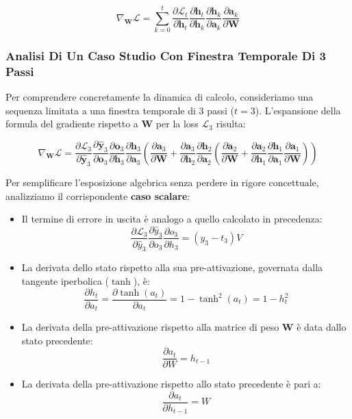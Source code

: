 ﻿\documentclass[11pt, a4paper]{article}
\begin{document}
\[
\nabla_{\bm{W}}\mathcal{L} = \sum_{k=0}^{t} \frac{\partial \mathcal{L}_t}{\partial \bm{h}_t} \frac{\partial \bm{h}_t}{\partial \bm{h}_k} \frac{\partial \bm{h}_k}{\partial \bm{a}_k} \frac{\partial \bm{a}_k}{\partial \bm{W}}
\]

\subsubsection{Analisi Di Un Caso Studio Con Finestra Temporale Di 3 Passi}

Per comprendere concretamente la dinamica di calcolo, consideriamo una sequenza limitata a una finestra temporale di 3 passi ($t=3$). L'espansione della formula del gradiente rispetto a $\bm{W}$ per la loss $\mathcal{L}_3$ risulta:

\[
\nabla_{\bm{W}}\mathcal{L} = \frac{\partial \mathcal{L}_3}{\partial \hat{\bm{y}}_3} \frac{\partial \hat{\bm{y}}_3}{\partial \bm{o}_3} \frac{\partial \bm{o}_3}{\partial \bm{h}_3} \frac{\partial \bm{h}_3}{\partial \bm{a}_3} \left( \frac{\partial \bm{a}_3}{\partial \bm{W}} + \frac{\partial \bm{a}_3}{\partial \bm{h}_2} \frac{\partial \bm{h}_2}{\partial \bm{a}_2} \left( \frac{\partial \bm{a}_2}{\partial \bm{W}} + \frac{\partial \bm{a}_2}{\partial \bm{h}_1} \frac{\partial \bm{h}_1}{\partial \bm{a}_1} \frac{\partial \bm{a}_1}{\partial \bm{W}} \right) \right)
\]

Per semplificare l'esposizione algebrica senza perdere in rigore concettuale, analizziamo il corrispondente \textbf{caso scalare}:

\begin{itemize}
    \item Il termine di errore in uscita è analogo a quello calcolato in precedenza:
    \[
    \frac{\partial \mathcal{L}_3}{\partial \hat{y}_3} \frac{\partial \hat{y}_3}{\partial o_3} \frac{\partial o_3}{\partial h_3} = (y_3 - t_3)V
    \]
    \item La derivata dello stato rispetto alla sua pre-attivazione, governata dalla tangente iperbolica ($\tanh$), è:
    \[
    \frac{\partial h_t}{\partial a_t} = \frac{\partial \tanh(a_t)}{\partial a_t} = 1 - \tanh^2(a_t) = 1 - h_t^2
    \]
    \item La derivata della pre-attivazione rispetto alla matrice di peso $\bm{W}$ è data dallo stato precedente:
    \[
    \frac{\partial a_t}{\partial W} = h_{t-1}
    \]
    \item La derivata della pre-attivazione rispetto allo stato precedente è pari a:
    \[
    \frac{\partial a_t}{\partial h_{t-1}} = W
    \]
\end{itemize}
\end{document}
